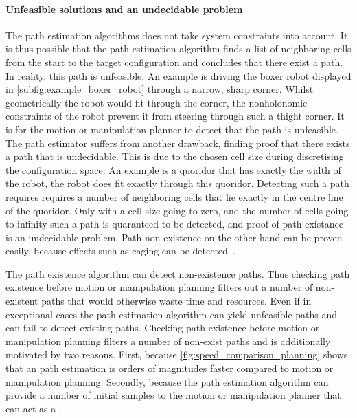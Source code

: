 \paragraph{Unfeasible solutions and an undecidable problem}
The path estimation algorithms does not take system constraints into account. It is thus possible that the path estimation algorithm finds a list of neighboring cells from the start to the target configuration and concludes that there exist a path. In reality, this path is unfeasible. An example is driving the boxer robot displayed in \cref{subfig:example_boxer_robot} through a narrow, sharp corner. Whilst geometrically the robot would fit through the corner, the nonholonomic constraints of the robot prevent it from steering through such a thight corner. It is for the motion or manipulation planner to detect that the path is unfeasible.\\

The path estimator suffers from another drawback, finding proof that there exists a path that is undecidable. This is due to the chosen cell size during discretising the configuration space. An example is a quoridor that has exactly the width of the robot, the robot does fit exactly through this quoridor. Detecting such a path requires requires a number of neighboring cells that lie exactly in the centre line of the quoridor. Only with a cell size going to zero, and the number of cells going to infinity such a path is quaranteed to be detected, and proof of path existance is an undecidable problem. Path non-existence on the other hand can be proven easily, because effects such as caging can be detected~\cite{chen_fast_2018}.\bs

The path existence algorithm can detect non-existence paths. Thus checking path existence before motion or manipulation planning filters out a number of non-existent paths that would otherwise waste time and resources. Even if in exceptional cases the path estimation algorithm can yield unfeasible paths and can fail to detect existing paths. Checking path existence before motion or manipulation planning filters a number of non-exist paths and is additionally motivated by two reasons. First, because \cref{fig:speed_comparison_planning} shows that an path estimation is orders of magnitudes faster compared to motion or manipulation planning. Secondly, because the path estimation algorithm can provide a number of initial samples to the motion or manipulation planner that can act as a .




